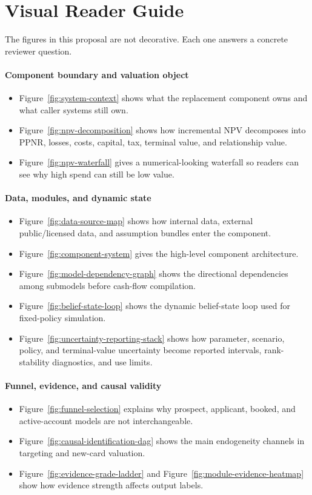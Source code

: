 \documentclass[11pt]{article}
\newcommand{\1}{\mathbf{1}}
\newcommand{\readerbox}[2]{\paragraph{#1}\begin{itemize}[leftmargin=1.5em,itemsep=0.1em,topsep=0.15em]#2\end{itemize}}
\begin{document}
\section*{Visual Reader Guide}

The figures in this proposal are not decorative. Each one answers a concrete
reviewer question.

\readerbox{Component boundary and valuation object}{
  \item Figure~\ref{fig:system-context} shows what the replacement component
        owns and what caller systems still own.
  \item Figure~\ref{fig:npv-decomposition} shows how incremental NPV decomposes
        into PPNR, losses, costs, capital, tax, terminal value, and relationship
        value.
  \item Figure~\ref{fig:npv-waterfall} gives a numerical-looking waterfall so
        readers can see why high spend can still be low value.
}
\readerbox{Data, modules, and dynamic state}{
  \item Figure~\ref{fig:data-source-map} shows how internal data, external
        public/licensed data, and assumption bundles enter the component.
  \item Figure~\ref{fig:component-system} gives the high-level component
        architecture.
  \item Figure~\ref{fig:model-dependency-graph} shows the directional
        dependencies among submodels before cash-flow compilation.
  \item Figure~\ref{fig:belief-state-loop} shows the dynamic belief-state loop
        used for fixed-policy simulation.
  \item Figure~\ref{fig:uncertainty-reporting-stack} shows how parameter,
        scenario, policy, and terminal-value uncertainty become reported
        intervals, rank-stability diagnostics, and use limits.
}
\readerbox{Funnel, evidence, and causal validity}{
  \item Figure~\ref{fig:funnel-selection} explains why prospect, applicant,
        booked, and active-account models are not interchangeable.
  \item Figure~\ref{fig:causal-identification-dag} shows the main endogeneity
        channels in targeting and new-card valuation.
  \item Figure~\ref{fig:evidence-grade-ladder} and
        Figure~\ref{fig:module-evidence-heatmap} show how evidence strength
        affects output labels.
}
\end{document}
